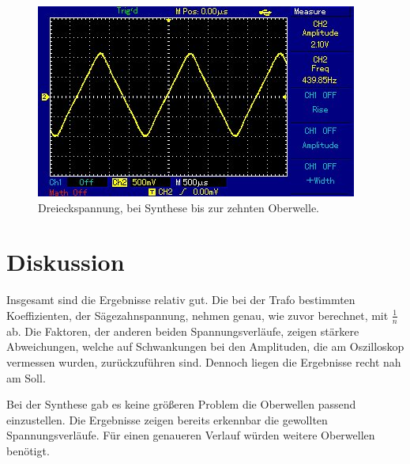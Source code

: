 \documentclass[
  bibliography=totoc,     %
  captions=tableheading,  %
  titlepage=firstiscover, %
]{scrartcl}
\begin{document}
\begin{figure}
  \centering
  \includegraphics[width=\textwidth]{MAP003.jpg}
  \caption{Dreieckspannung, bei Synthese bis zur zehnten Oberwelle.}
  \label{fig:Drei}
\end{figure}
\clearpage
\section{Diskussion}
Insgesamt sind die Ergebnisse relativ gut. Die bei der Trafo bestimmten Koeffizienten,
der Sägezahnspannung, nehmen genau, wie zuvor berechnet, mit $\frac{1}{n}$ ab.
Die Faktoren, der anderen beiden Spannungsverläufe, zeigen stärkere Abweichungen,
welche auf Schwankungen bei den Amplituden, die am Oszilloskop vermessen wurden,
zurückzuführen sind. Dennoch liegen die Ergebnisse recht nah am Soll.

Bei der Synthese gab es keine größeren Problem die Oberwellen passend einzustellen.
Die Ergebnisse zeigen bereits erkennbar die gewollten Spannungsverläufe. Für einen
genaueren Verlauf würden weitere Oberwellen benötigt.
\nocite{*}
\printbibliography
\end{document}
